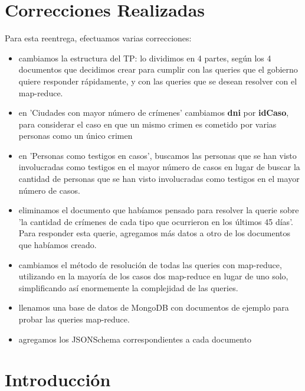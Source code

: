 \documentclass[11pt, a4paper]{article}
\begin{document}

\maketitle
\newpage

\tableofcontents
\newpage

%

\section{Correcciones Realizadas}
Para esta reentrega, efectuamos varias correcciones:
\begin{itemize}
	\item cambiamos la estructura del TP: lo dividimos en 4 partes, según los 4 documentos que decidimos crear para cumplir con las queries que el gobierno quiere responder rápidamente, y con las queries que se desean resolver con el map-reduce.
	\item en  'Ciudades con mayor número de crímenes' cambiamos \textbf{dni} por \textbf{idCaso}, para considerar el caso en que un mismo crimen es cometido por varias personas como un único crimen
	\item en 'Personas como testigos en casos',  buscamos las personas que se han visto involucradas como testigos en el mayor número de casos en lugar de buscar la cantidad de personas que se han visto involucradas como testigos en el mayor número de casos.
	\item eliminamos el documento que habíamos pensado para resolver la querie sobre 'la cantidad de crímenes de cada tipo que ocurrieron en los últimos 45 días'. Para responder esta querie, agregamos más datos a otro de los documentos que habíamos creado.
	\item cambiamos el método de resolución de todas las queries con map-reduce, utilizando en la mayoría de los casos dos map-reduce en lugar de uno solo, simplificando así enormemente la complejidad de las queries.
	\item llenamos una base de datos de MongoDB con documentos de ejemplo para probar las queries map-reduce.
	\item agregamos los JSONSchema correspondientes a cada documento 
\end{itemize}

\newpage
\section{Introducción}
\end{document}
